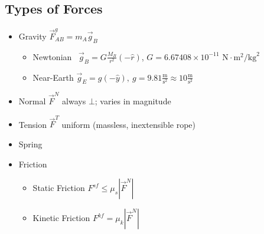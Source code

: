 \documentclass[]{article}
\begin{document}
\newpage
\begin{TeacherMargin}

\end{TeacherMargin}
\begin{PresentSpace}
\vspace{-10pt}
\section*{Types of Forces}
\vspace{-10pt}
\begin{itemize}
	\item Gravity \qquad \qquad \qquad \qquad $\vec{F}^{g}_{AB} = m_{A}\vec{g}_{B}$
	\begin{itemize}
		\item Newtonian \qquad\ $\vec{g}_{B} = G\frac{M_{B}}{r^{2}}(-\hat{r})$, $G = 6.67408\times10^{-11}\text{ N}\cdot\text{m}^{2}/\text{kg}^{2}$
		\item Near-Earth \qquad $\vec{g}_{E} = g(-\hat{y}),\ g=9.81\frac{\text{m}}{\text{s}^{2}} \approx 10\frac{\text{m}}{\text{s}^{2}}$
	\end{itemize}
	\item Normal \qquad $\vec{F}^{N}$ always $\bot$; varies in magnitude
	\item Tension \qquad $\vec{F}^{T}$ uniform (massless, inextensible rope)
	\item Spring
	\item Friction
	\begin{itemize}
		\item Static Friction \qquad $F^{sf}\leq\mu_{s}|\vec{F}^{N}|$
		\item Kinetic Friction \qquad $F^{kf}=\mu_{k}|\vec{F}^{N}|$
	\end{itemize}
\end{itemize}
\end{PresentSpace}
\newpage
\begin{TeacherMargin}

\end{TeacherMargin}
\end{document}
